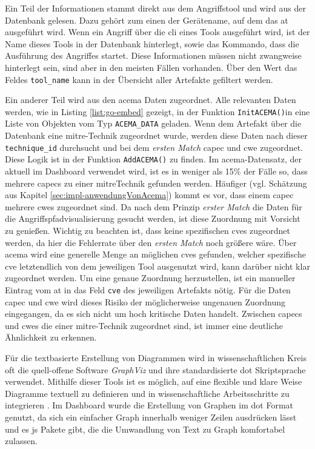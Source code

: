 \par Ein Teil der Informationen stammt direkt aus dem Angriffstool und wird aus der Datenbank gelesen. Dazu gehört zum einen der Gerätename, auf dem das \gls{at} ausgeführt wird. Wenn ein Angriff über die \gls{cli} eines Tools ausgeführt wird, ist der Name dieses Tools in der Datenbank hinterlegt, sowie das Kommando, dass die Ausführung des Angriffes startet. Diese Informationen müssen nicht zwangweise hinterlegt sein, sind aber in den meisten Fällen vorhanden. Über den Wert das Feldes \verb|tool_name| kann in der Übersicht aller Artefakte gefiltert werden.
\par Ein anderer Teil wird aus den \gls{acema} Daten zugeordnet. Alle relevanten Daten werden, wie in Listing \ref{list:go-embed} gezeigt, in der Funktion \verb|InitACEMA()|in eine Liste von Objekten vom Typ \verb|ACEMA_DATA| geladen. Wenn dem Artefakt über die Datenbank eine \gls{mitre}-Technik zugeordnet wurde, werden diese Daten nach dieser \verb|technique_id| durchsucht und bei dem \textit{ersten Match} \gls{capec} und \gls{cwe} zugeordnet. Diese Logik ist in der Funktion \verb|AddACEMA()| zu finden. Im \gls{acema}-Datensatz, der aktuell im Dashboard verwendet wird, ist es in weniger als 15\% der Fälle so, dass mehrere \glspl{capec} zu einer \gls{mitre}Technik gefunden werden. Häufiger (vgl. Schätzung aus Kapitel \ref{sec:impl-anwendungVonAcema}) kommt es vor, dass einem \gls{capec} mehrere \glspl{cwe} zugeordnet sind. Da nach dem Prinzip \textit{erster Match} die Daten für die Angriffspfadvisualisierung gesucht werden, ist diese Zuordnung mit Vorsicht zu genießen. Wichtig zu beachten ist, dass keine spezifischen \glspl{cve} zugeordnet werden, da hier die Fehlerrate über den \textit{ersten Match} noch größere wäre. Über \gls{acema} wird eine generelle Menge an möglichen \glspl{cve} gefunden, welcher spezifische \gls{cve} letztendlich von dem jeweiligen Tool ausgenutzt wird, kann darüber nicht klar zugeordnet werden. Um eine genaue Zuordnung herzustellen, ist ein manueller Eintrag vom \gls{at} in das Feld \verb|cve| des jeweiligen Artefakts nötig. Für die Daten \gls{capec} und \gls{cwe} wird dieses Risiko der möglicherweise ungenauen Zuordnung eingegangen, da es sich nicht um hoch kritische Daten handelt. Zwischen \glspl{capec} und \glspl{cwe} die einer \gls{mitre}-Technik zugeordnet sind, ist immer eine deutliche Ähnlichkeit zu erkennen.
\par Für die textbasierte Erstellung von Diagrammen wird in wissenschaftlichen Kreis oft die quell-offene Software \textit{GraphViz} und ihre standardisierte \gls{dot} Skriptsprache verwendet. Mithilfe dieser Tools ist es möglich, auf eine flexible und klare Weise Diagramme textuell zu definieren und in wissenschaftliche Arbeitsschritte zu integrieren \autocite{Graphviz,DOTLanguage}. Im Dashboard wurde die Erstellung von Graphen im \gls{dot} Format genutzt, da sich ein einfacher Graph innerhalb weniger Zeilen ausdrücken lässt und es \gls{js} Pakete gibt, die die Umwandlung von Text zu Graph komfortabel zulassen.
